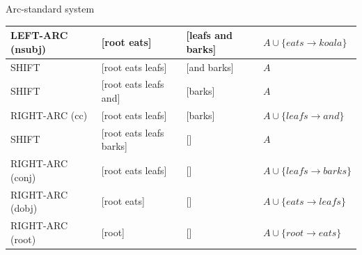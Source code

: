 \documentclass[12pt]{article}
\newenvironment{answer}[2][Answer]{\begin{trivlist}
\item[\hskip \labelsep {\bfseries #1}\hskip \labelsep {\bfseries #2:}]}{\end{trivlist}}
\begin{document}
\begin{answer}{a)}{Arc-standard system}
\begin{table}[h!]
\begin{tabular}{|l|l|l|l|}
LEFT-ARC (nsubj) & {[}root eats{]}             & {[}leafs and barks{]}              & $A \cup\{eats \to koala\}$                                                                                                             \\ \hline
SHIFT            & {[}root eats leafs{]}       & {[}and barks{]}                    & $A$                                                                                                             \\ \hline
SHIFT            & {[}root eats leafs and{]}   & {[}barks{]}                        & $A$                                                                                                             \\ \hline
RIGHT-ARC (cc)   & {[}root eats leafs{]}       & {[}barks{]}                        & $A \cup\{leafs \to and\}$                                                                                              \\ \hline
SHIFT            & {[}root eats leafs barks{]} & {[}{]}                             & $A$                                                                                              \\ \hline
RIGHT-ARC (conj) & {[}root eats leafs{]}       & {[}{]}                             & $A \cup\{leafs \to barks\}$                            \\ \hline
RIGHT-ARC (dobj) & {[}root eats{]}             & {[}{]}                             & $A \cup\{eats \to leafs\}$              \\ \hline
RIGHT-ARC (root) & {[}root{]}                  & {[}{]}                             & $A \cup\{root \to eats\}$ \\ \hline
\end{tabular}
\end{table}
\end{answer}
\end{document}
